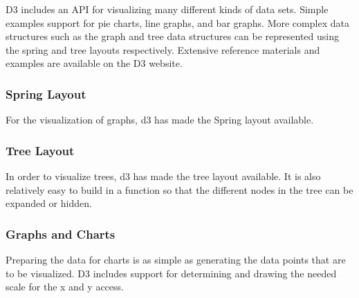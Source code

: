 D3 includes an API for visualizing many different kinds of data sets. Simple examples support for pie charts, line graphs, and bar graphs. More complex data structures such as the graph and tree data structures can be represented using the spring and tree layouts respectively. Extensive reference materials and examples are available on the D3 website.

\subsubsection{Spring Layout}

For the visualization of graphs, d3 has made the Spring layout available.

\subsubsection{Tree Layout}

In order to visualize trees, d3 has made the tree layout available. It is also relatively easy to build in a function so that the different nodes in the tree can be expanded or hidden.

\subsubsection{Graphs and Charts}

Preparing the data for charts is as simple as generating the data points that are to be visualized. D3 includes support for determining and drawing the needed scale for the x and y access. 